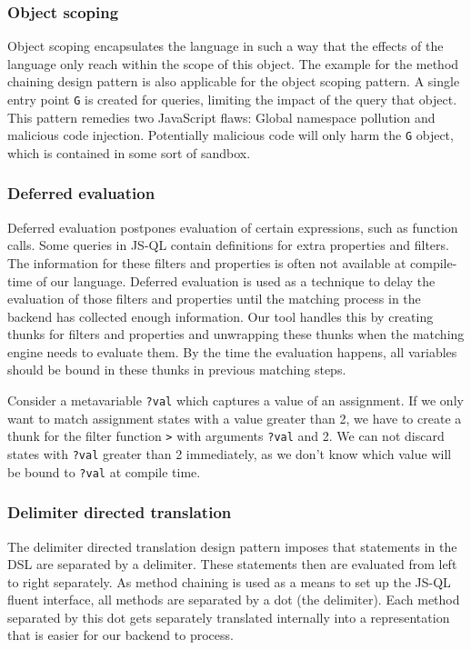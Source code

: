 \subsubsection*{Object scoping}

Object scoping encapsulates the language in such a way that the effects of the language only reach within the scope of this object. The example for the method chaining design pattern is also applicable for the object scoping pattern. A single entry point \texttt{G} is created for queries, limiting the impact of the query that object. This pattern remedies two JavaScript flaws: Global namespace pollution and malicious code injection. Potentially malicious code will only harm the \texttt{G} object, which is contained in some sort of sandbox.

\subsubsection*{Deferred evaluation}
Deferred evaluation postpones evaluation of certain expressions, such as function calls. Some queries in JS-QL contain definitions for extra properties and filters. The information for these filters and properties is often not available at compile-time of our language. Deferred evaluation is used as a technique to delay the evaluation of those filters and properties until the matching process in the backend has collected enough information. Our tool handles this by creating thunks for filters and properties and unwrapping these thunks when the matching engine needs to evaluate them. By the time the evaluation happens, all variables should be bound in these thunks in previous matching steps.
\begin{exmp}
Consider a metavariable \texttt{?val} which captures a value of an assignment. If we only want to match assignment states with a value greater than 2, we have to create a thunk for the filter function \texttt{>} with arguments \texttt{?val} and 2. We can not discard states with \texttt{?val} greater than 2 immediately, as we don't know which value will be bound to \texttt{?val} at compile time.
\end{exmp}

\subsubsection*{Delimiter directed translation}
The delimiter directed translation design pattern imposes that statements in the DSL are separated by a delimiter. These statements then are evaluated from left to right separately. As method chaining is used as a means to set up the JS-QL fluent interface, all methods are separated by a dot (the delimiter). Each method separated by this dot gets separately translated internally into a representation that is easier for our backend to process.

